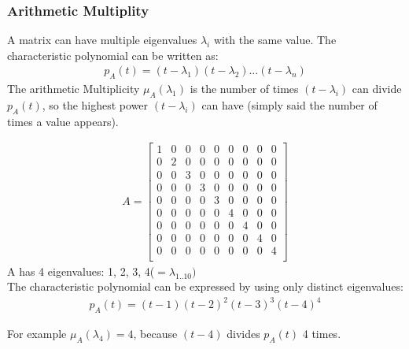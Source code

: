\subsubsection{Arithmetic Multiplity}
A matrix can have multiple eigenvalues $\lambda_i$ with the same value.
The characteristic polynomial can be written as:
\begin{align*}
    p_A(t) = (t-\lambda_1)(t-\lambda_2) \dots (t-\lambda_n)
\end{align*}
The arithmetic Multiplicity $\mu_A(\lambda_1)$ is the number of times $(t - \lambda_i)$ can divide $p_A(t)$,
so the highest power $(t - \lambda_i)$ can have (simply said the number of times a value appears).
\begin{example}
    \begin{align*}
        A = \begin{bmatrix}
            1 & 0 & 0 & 0 & 0 & 0 & 0 & 0 & 0 \\
            0 & 2 & 0 & 0 & 0 & 0 & 0 & 0 & 0 \\
            0 & 0 & 3 & 0 & 0 & 0 & 0 & 0 & 0 \\
            0 & 0 & 0 & 3 & 0 & 0 & 0 & 0 & 0 \\
            0 & 0 & 0 & 0 & 3 & 0 & 0 & 0 & 0 \\
            0 & 0 & 0 & 0 & 0 & 4 & 0 & 0 & 0 \\
            0 & 0 & 0 & 0 & 0 & 0 & 4 & 0 & 0 \\
            0 & 0 & 0 & 0 & 0 & 0 & 0 & 4 & 0 \\
            0 & 0 & 0 & 0 & 0 & 0 & 0 & 0 & 4 \\
        \end{bmatrix}
    \end{align*}
    A has 4 eigenvalues: 1, 2, 3, 4($=\lambda_{1..10})$\\
    The characteristic polynomial can be expressed by using only distinct eigenvalues:
    \begin{align*}
        p_A(t) = (t -1)(t-2)^2(t-3)^3(t-4)^4
    \end{align*}
\end{example}
For example $\mu_A(\lambda_4) = 4$, because $(t - 4)$ divides $p_A(t)$ 4 times.

